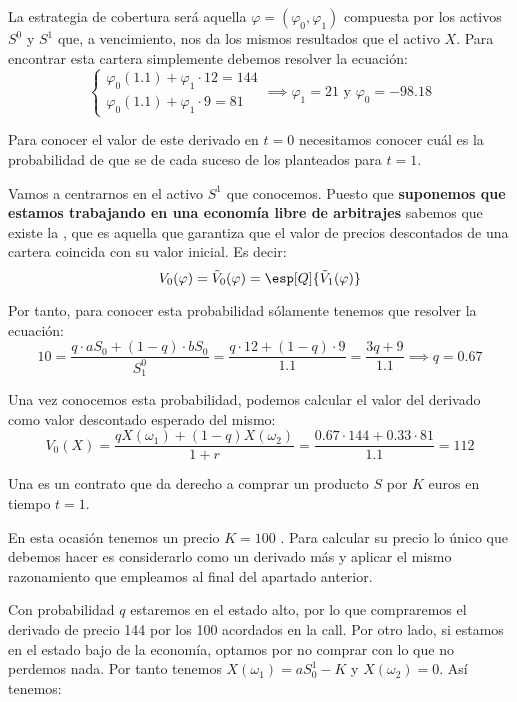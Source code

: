 \begin{problem}[2]
La estrategia de cobertura será aquella $\varphi=(\varphi_0,\varphi_1)$ compuesta por los activos $S^0$ y $S^1$ que, a vencimiento, nos da los mismos resultados que el activo $X$. Para encontrar esta cartera simplemente debemos resolver la ecuación:
\[\left\{ \begin{array}{l}
\varphi_0(1.1) + \varphi_1\cdot 12 = 144 \\
\varphi_0(1.1) + \varphi_1\cdot 9 = 81
\end{array}\right. \implies \varphi_1 = 21 \text{ y } \varphi_0 = -98.18\]

\spart

Para conocer el valor de este derivado en $t=0$ necesitamos conocer cuál es la probabilidad de que se de cada suceso de los planteados para $t=1$.

Vamos a centrarnos en el activo $S^1$ que conocemos. Puesto que \textbf{suponemos que estamos trabajando en una economía libre de arbitrajes} sabemos que existe la , que es aquella que garantiza que el valor de precios descontados de una cartera coincida con su valor inicial. Es decir:
\[V_0(\varphi) = \tilde{V}_0(\varphi) = \esp[Q]{\tilde{V}_1(\varphi)}\]

Por tanto, para conocer esta probabilidad sólamente tenemos que resolver la ecuación:
\[10 =  \frac{q\cdot aS_0 + (1-q)\cdot bS_0}{S_1^0} =  \frac{q\cdot 12 + (1-q)\cdot 9}{1.1} = \frac{3q + 9}{1.1} \implies q=0.67\]

Una vez conocemos esta probabilidad, podemos calcular el valor del derivado como valor descontado esperado del mismo:
\[V_0(X) = \frac{qX(ω_1) + (1-q)X(ω_2)}{1+r} = \frac{0.67\cdot 144 + 0.33\cdot 81}{1.1} = 112\]

\spart

Una  es un contrato que da derecho a comprar un producto $S$ por $K$ euros en tiempo $t=1$.

En esta ocasión tenemos un precio $K=100$ \texteuro. Para calcular su precio lo único que debemos hacer es considerarlo como un derivado más y aplicar el mismo razonamiento que empleamos al final del apartado anterior.

Con probabilidad $q$ estaremos en el estado alto, por lo que compraremos el derivado de precio 144 \texteuro por los 100 \texteuro acordados en la call. Por otro lado, si estamos en el estado bajo de la economía, optamos por no comprar con lo que no perdemos nada. Por tanto tenemos $X(ω_1)=aS^1_0-K$ y $X(ω_2)=0$. Así tenemos:


\end{problem}

